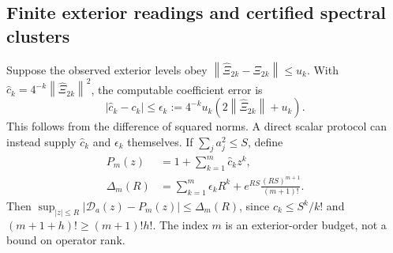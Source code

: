 \documentclass[11pt,a4paper]{amsart}
\numberwithin{equation}{section}
\theoremstyle{definition}
\theoremstyle{remark}
\newcommand{\norm}[1]{\left\lVert#1\right\rVert}
\begin{document}
\subsection{Finite exterior readings and certified spectral clusters}
Suppose the observed exterior levels obey
$\norm{\widehat\Xi_{2k}-\Xi_{2k}}\le u_k$. With
$\widehat c_k=4^{-k}\norm{\widehat\Xi_{2k}}^2$, the computable coefficient error is
\begin{equation}\label{eq:pfaffian_exterior_reading_error}
 |\widehat c_k-c_k|\le\epsilon_k
 :=4^{-k}u_k(2\norm{\widehat\Xi_{2k}}+u_k).
\end{equation}
This follows from the difference of squared norms. A direct scalar protocol can instead supply $\widehat c_k$ and $\epsilon_k$ themselves. If $\sum_ja_j^2\le S$, define
\begin{align}
 P_m(z)&=1+\sum_{k=1}^m\widehat c_kz^k,\label{eq:pfaffian_polynomial_data}\\
 \Delta_m(R)&=\sum_{k=1}^m\epsilon_kR^k
       +e^{RS}\frac{(RS)^{m+1}}{(m+1)!}.
 \label{eq:pfaffian_analytic_budget}
\end{align}
Then $\sup_{|z|\le R}|\mathscr D_a(z)-P_m(z)|\le\Delta_m(R)$, since
$c_k\le S^k/k!$ and $(m+1+h)!\ge(m+1)!h!$. The index $m$ is an exterior-order budget, not a bound on operator rank.
\end{document}
